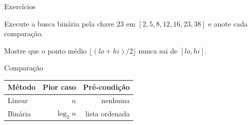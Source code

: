 \documentclass[aspectratio=169,10pt,brazil]{beamer}
\begin{document}
\begin{frame}{Exercícios}
  \begin{exercicio}
    Execute a busca binária pela chave 23 em $[2, 5, 8, 12, 16, 23, 38]$ e anote
    cada comparação.
  \end{exercicio}
  \begin{exercicio}[difícil]
    Mostre que o ponto médio $\lfloor (lo + hi)/2 \rfloor$ nunca sai de $[lo, hi]$.
  \end{exercicio}
\end{frame}

\begin{frame}{Comparação}
  \centering
  \begin{tabular}{lrr}
    \hline
    Método & Pior caso & Pré-condição \\ \hline
    Linear & $n$ & nenhuma \\
    Binária & $\log_2 n$ & lista ordenada \\ \hline
  \end{tabular}
\end{frame}
\end{document}
